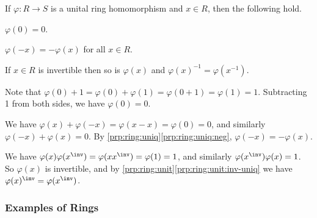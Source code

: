 \begin{prp}
If $\varphi : R \rightarrow S$ is a unital ring homomorphism and $x \in R$, then the following hold.
\begin{enumerate*}
\item $\varphi(0) = 0$.
\item $\varphi(-x) = -\varphi(x)$ for all $x \in R$.
\item If $x \in R$ is invertible then so is $\varphi(x)$ and $\varphi(x)^{-1} = \varphi(x^{-1})$.
\end{enumerate*}
\end{prp}

\begin{theproof}
\begin{inparaenum}
\item Note that $\varphi(0) + 1 = \varphi(0) + \varphi(1) = \varphi(0+1) = \varphi(1) = 1$. Subtracting 1 from both sides, we have $\varphi(0) = 0$.
\item We have $\varphi(x) + \varphi(-x) = \varphi(x-x) = \varphi(0) = 0$, and similarly $\varphi(-x) + \varphi(x) = 0$. By \ref{prp:ring:uniq}\ref{prp:ring:uniq:neg}, $\varphi(-x) = -\varphi(x)$.
\item We have $\varphi(x)\varphi(x^\inv) = \varphi(xx^\inv) = \varphi(1) = 1$, and similarly $\varphi(x^\inv)\varphi(x) = 1$. So $\varphi(x)$ is invertible, and by \ref{prp:ring:unit}\ref{prp:ring:unit:inv-uniq} we have $\varphi(x)^\inv = \varphi(x^\inv)$.
\end{inparaenum}
\end{theproof}

\NowForSomeExercises

\subsubsection*{Examples of Rings}

